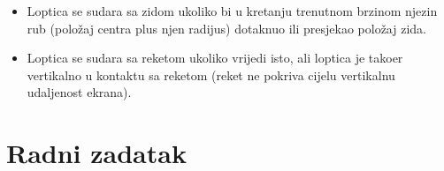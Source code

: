 \documentclass[10pt,a4paper]{article}
\begin{document}
\begin{itemize}
	\item Loptica se sudara sa zidom ukoliko bi u kretanju trenutnom brzinom njezin rub (polo\v{z}aj centra plus njen radijus) dotaknuo ili presjekao polo\v{z}aj zida.
	\item Loptica se sudara sa reketom ukoliko vrijedi isto, ali loptica je tako\dj{}er vertikalno u kontaktu sa reketom (reket ne pokriva cijelu vertikalnu udaljenost ekrana).
	

\end{itemize}

\section{Radni zadatak}
\end{document}
